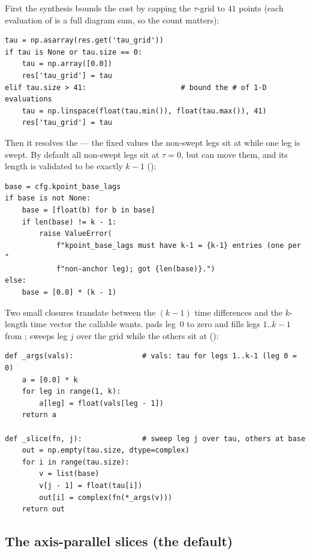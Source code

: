 First the synthesis bounds the cost by capping the $\tau$-grid to $41$ points
(each evaluation of  is a full diagram sum, so the count matters):

\begin{lstlisting}
tau = np.asarray(res.get('tau_grid'))
if tau is None or tau.size == 0:
    tau = np.array([0.0])
    res['tau_grid'] = tau
elif tau.size > 41:                      # bound the # of 1-D evaluations
    tau = np.linspace(float(tau.min()), float(tau.max()), 41)
    res['tau_grid'] = tau
\end{lstlisting}

Then it resolves the  --- the fixed values the non-swept legs sit
at while one leg is swept. By default all non-swept legs sit at $\tau=0$, but
 can move them, and its length is validated to be
exactly $k-1$ ():

\begin{lstlisting}
base = cfg.kpoint_base_lags
if base is not None:
    base = [float(b) for b in base]
    if len(base) != k - 1:
        raise ValueError(
            f"kpoint_base_lags must have k-1 = {k-1} entries (one per "
            f"non-anchor leg); got {len(base)}.")
else:
    base = [0.0] * (k - 1)
\end{lstlisting}

Two small closures translate between the $(k-1)$ time differences and the
$k$-length time vector the callable wants.  pads leg~$0$ to zero
and fills legs $1..k-1$ from ;  sweeps leg $j$ over
the grid while the others sit at  ():

\begin{lstlisting}
def _args(vals):                # vals: tau for legs 1..k-1 (leg 0 = 0)
    a = [0.0] * k
    for leg in range(1, k):
        a[leg] = float(vals[leg - 1])
    return a

def _slice(fn, j):              # sweep leg j over tau, others at base
    out = np.empty(tau.size, dtype=complex)
    for i in range(tau.size):
        v = list(base)
        v[j - 1] = float(tau[i])
        out[i] = complex(fn(*_args(v)))
    return out
\end{lstlisting}

\subsection{The axis-parallel slices (the default)}

